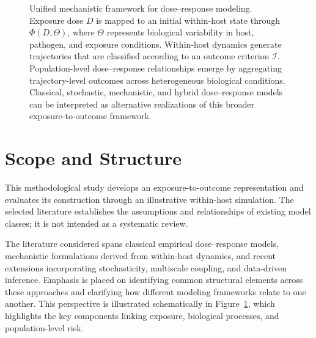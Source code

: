 \documentclass[11pt]{article}
\begin{document}
\begin{figure}[t]
{%
}

\caption{
Unified mechanistic framework for dose--response modeling. Exposure dose $D$ is mapped to an initial within-host state through $\Phi(D,\Theta)$, where $\Theta$ represents biological variability in host, pathogen, and exposure conditions. Within-host dynamics generate trajectories that are classified according to an outcome criterion $\mathcal I$. Population-level dose--response relationships emerge by aggregating trajectory-level outcomes across heterogeneous biological conditions. Classical, stochastic, mechanistic, and hybrid dose--response models can be interpreted as alternative realizations of this broader exposure-to-outcome framework.
}
\label{fig:unified_mechanistic_framework}
\end{figure}




\section{Scope and Structure}

This methodological study develops an exposure-to-outcome representation and evaluates its construction through an illustrative within-host simulation. The selected literature establishes the assumptions and relationships of existing model classes; it is not intended as a systematic review.

The literature considered spans classical empirical dose--response models, mechanistic formulations derived from within-host dynamics, and recent extensions incorporating stochasticity, multiscale coupling, and data-driven inference. Emphasis is placed on identifying common structural elements across these approaches and clarifying how different modeling frameworks relate to one another. This perspective is illustrated schematically in Figure~\ref{fig:unified_mechanistic_framework}, which highlights the key components linking exposure, biological processes, and population-level risk.
\end{document}
